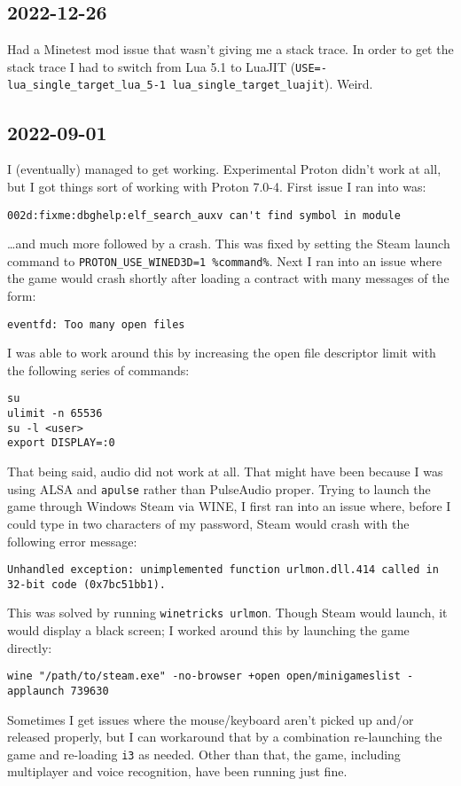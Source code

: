 \documentclass{article}
\begin{document}
\subsection{2022-12-26}
Had a Minetest mod issue that wasn't giving me a stack trace.  In order to get the stack trace I had to switch from Lua 5.1 to LuaJIT (\texttt{USE=-lua_single_target_lua_5-1 lua_single_target_luajit}).  Weird.

\subsection{2022-09-01}
I (eventually) managed to get  working.  Experimental Proton didn't work at all, but I got things sort of working with Proton 7.0-4.  First issue I ran into was:
\begin{verbatim}
002d:fixme:dbghelp:elf_search_auxv can't find symbol in module
\end{verbatim}
\ldots and much more followed by a crash.  This was fixed by setting the Steam launch command to \verb|PROTON_USE_WINED3D=1 %command%|.  Next I ran into an issue where the game would crash shortly after loading a contract with many messages of the form:
\begin{verbatim}
eventfd: Too many open files
\end{verbatim}
I was able to work around this by increasing the open file descriptor limit with the following series of commands:
\begin{verbatim}
su
ulimit -n 65536
su -l <user>
export DISPLAY=:0
\end{verbatim}
That being said, audio did not work at all.  That might have been because I was using ALSA and \texttt{apulse} rather than PulseAudio proper.  Trying to launch the game through Windows Steam via WINE, I first ran into an issue where, before I could type in two characters of my password, Steam would crash with the following error message:
\begin{verbatim}
Unhandled exception: unimplemented function urlmon.dll.414 called in 32-bit code (0x7bc51bb1).
\end{verbatim}
This was solved by running \texttt{winetricks urlmon}.  Though Steam would launch, it would display a black screen; I worked around this by launching the game directly:
\begin{verbatim}
wine "/path/to/steam.exe" -no-browser +open open/minigameslist -applaunch 739630
\end{verbatim}
Sometimes I get issues where the mouse/keyboard aren't picked up and/or released properly, but I can workaround that by a combination re-launching the game and re-loading \texttt{i3} as needed.  Other than that, the game, including multiplayer and voice recognition, have been running just fine.
\end{document}
